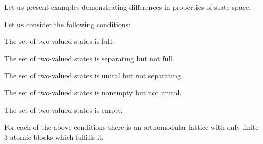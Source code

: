Let us present examples demonstrating differences in properties of state
space.


\begin {proposition}  \label{statespaces}
Let us consider the following conditions:
  \begin {conditions}
  \item The set of two-valued states is full.
  \item The set of two-valued states is separating but not full.
  \item The set of two-valued states is unital but not separating.
  \item The set of two-valued states is nonempty but not unital.
  \item The set of two-valued states is empty.
  \end {conditions}
For each of the above conditions there is an orthomodular lattice with only
finite 3-atomic blocks which fulfills it.
\end {proposition}


